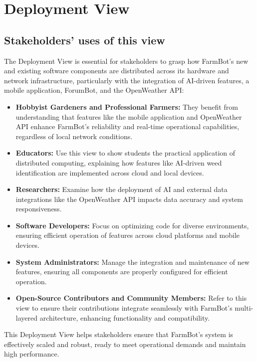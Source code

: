 \newpage
\section{Deployment View}

\subsection{Stakeholders’ uses of this view}
The Deployment View is essential for stakeholders to grasp how FarmBot's new and existing software components are distributed across its hardware and network infrastructure, particularly with the integration of AI-driven features, a mobile application, ForumBot, and the OpenWeather API:
\begin{itemize}
    \item \textbf{Hobbyist Gardeners and Professional Farmers:} They benefit from understanding that features like the mobile application and OpenWeather API enhance FarmBot's reliability and real-time operational capabilities, regardless of local network conditions.
    \item \textbf{Educators:} Use this view to show students the practical application of distributed computing, explaining how features like AI-driven weed identification are implemented across cloud and local devices.
    \item \textbf{Researchers:} Examine how the deployment of AI and external data integrations like the OpenWeather API impacts data accuracy and system responsiveness.
    \item \textbf{Software Developers:} Focus on optimizing code for diverse environments, ensuring efficient operation of features across cloud platforms and mobile devices.
    \item \textbf{System Administrators:} Manage the integration and maintenance of new features, ensuring all components are properly configured for efficient operation.
    \item \textbf{Open-Source Contributors and Community Members:} Refer to this view to ensure their contributions integrate seamlessly with FarmBot’s multi-layered architecture, enhancing functionality and compatibility.
\end{itemize}
This Deployment View helps stakeholders ensure that FarmBot's system is effectively scaled and robust, ready to meet operational demands and maintain high performance.

\newpage
